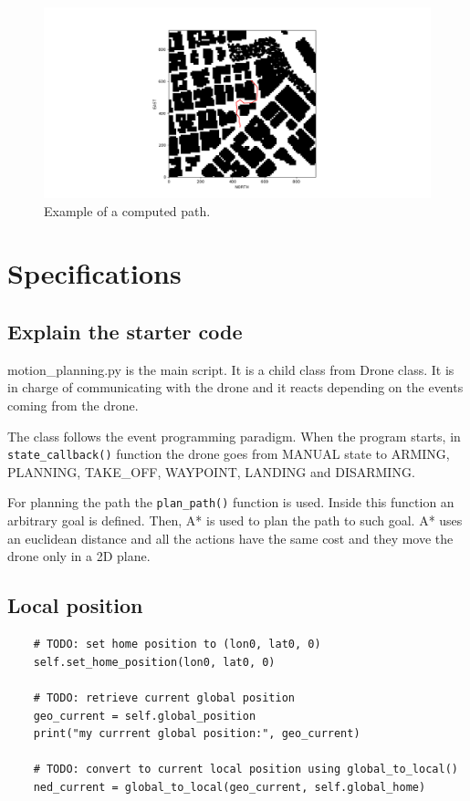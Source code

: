 \documentclass[]{article}
\begin{document}
\begin{figure}
\centering
\includegraphics[width=\linewidth, trim={11cm 1cm 11cm 2cm}, clip]{path}
\caption{Example of a computed path.}
\label{fig:path}
\end{figure}

\section{Specifications}


\subsection{Explain the starter code}

motion\_planning.py is the main script. It is a child class from Drone class. It is in charge of communicating with the drone and it reacts depending on the events coming from the drone. 

The class follows the event programming paradigm. When the program starts, in \texttt{state\_callback()} function the drone goes from MANUAL state to ARMING, PLANNING, TAKE\_OFF, WAYPOINT, LANDING and DISARMING.

For planning the path the \texttt{plan\_path()} function is used. Inside this function an arbitrary goal is defined. Then, A* is used to plan the path to such goal. A* uses an euclidean distance and all the actions have the same cost and they move the drone only in a 2D plane.

\subsection{Local position}

\begin{verbatim}
	# TODO: set home position to (lon0, lat0, 0)
	self.set_home_position(lon0, lat0, 0)
	
	# TODO: retrieve current global position
	geo_current = self.global_position
	print("my currrent global position:", geo_current)
	
	# TODO: convert to current local position using global_to_local()
	ned_current = global_to_local(geo_current, self.global_home)
\end{verbatim}
\end{document}
